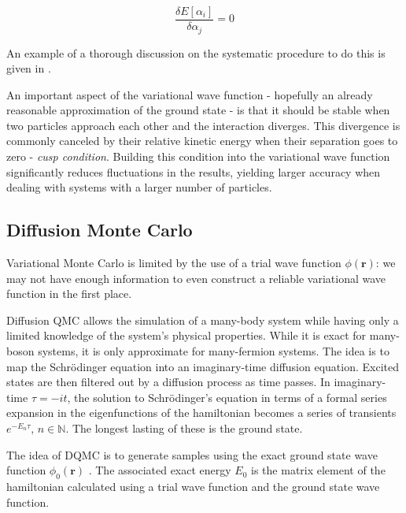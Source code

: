 \begin{equation}
\frac{\delta E[\alpha_i]}{\delta \alpha_j} = 0
\end{equation}

An example of a thorough discussion on the systematic procedure to do this is given in \cite{umrigar}.\par

An important aspect of the variational wave function - hopefully an already  reasonable approximation of the ground state - is that it should be stable when two particles approach each other and the interaction diverges. This divergence is commonly canceled by their relative kinetic energy when their separation goes to zero - \emph{cusp condition}\cite{mahan}. Building this condition into the variational wave function significantly reduces fluctuations in the results, yielding larger accuracy when dealing with systems with a larger number of particles.


\subsection{Diffusion Monte Carlo}\label{subsec:dmc}

Variational Monte Carlo is limited by the use of a trial wave function $\phi (\bm r)$: we may not have enough information to even construct a reliable variational wave function in the first place. \cite{tao}\par

Diffusion QMC allows the simulation of a many-body system while having only a limited knowledge of the system's physical properties. While it is exact for many-boson systems, it is only approximate for many-fermion systems. The idea is to map the Schr\"odinger equation into  an imaginary-time diffusion equation. Excited states are then filtered out by a diffusion process as time passes. In imaginary-time $\tau = - i t$, the solution to Schr\"odinger's equation in terms of a formal series expansion in the eigenfunctions of the hamiltonian becomes a series of transients $e^{-E_n \tau}, \, n \in \mathbb{N}$. The longest lasting of these is the ground state. \cite{kosztin} \par

The idea of DQMC is to generate samples using the exact ground state wave function $\phi_0 (\bm r)$ \cite{vmc}. The associated exact energy $E_0$ is the matrix element of the hamiltonian calculated using a trial wave function and the ground state wave function.

